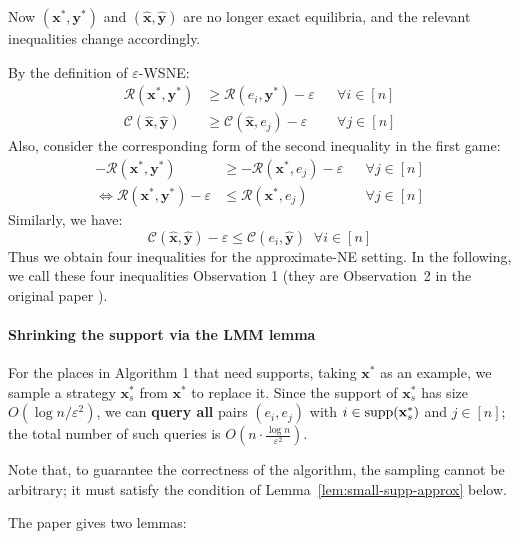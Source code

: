 Now \((\mathbf{x}^*, \mathbf{y}^*)\) and \((\hat{\mathbf{x}}, \hat{\mathbf{y}})\) are no longer exact equilibria, and the relevant inequalities change accordingly.

By the definition of \(\varepsilon\)-WSNE:
\begin{align*}
  \mathcal{R}(\mathbf{x}^*, \mathbf{y}^*)         & \ge \mathcal{R}(e_i, \mathbf{y}^*) - \varepsilon     &  & \forall i \in [n] \\
  \mathcal{C}(\hat{\mathbf{x}}, \hat{\mathbf{y}}) & \ge \mathcal{C}(\hat{\mathbf{x}}, e_j) - \varepsilon &  & \forall j \in [n]
\end{align*}
Also, consider the corresponding form of the second inequality in the first game:
\begin{align*}
  -\mathcal{R}(\mathbf{x}^*, \mathbf{y}^*)                   & \ge -\mathcal{R}(\mathbf{x}^*, e_j) - \varepsilon &  & \forall j \in [n] \\
  \iff \mathcal{R}(\mathbf{x}^*, \mathbf{y}^*) - \varepsilon & \le \mathcal{R}(\mathbf{x}^*, e_j)                &  & \forall j \in [n]
\end{align*}
Similarly, we have:
\[
  \mathcal{C}(\hat{\mathbf{x}}, \hat{\mathbf{y}}) - \varepsilon \le \mathcal{C}(e_i, \hat{\mathbf{y}}) \;\; \forall i \in [n]
\]
Thus we obtain four inequalities for the approximate-NE setting. In the following, we call these four inequalities Observation 1 (they are Observation~2 in the original paper \cite[Observation~2]{12WSNE}).

\paragraph{Shrinking the support via the LMM lemma}

For the places in Algorithm 1 that need supports, taking \(\mathbf{x}^*\) as an example, we sample a strategy \(\mathbf{x}_s^*\) from \(\mathbf{x}^*\) to replace it. Since the support of \(\mathbf{x}_s^*\) has size \(O(\log n / \varepsilon^2)\), we can \textbf{query all} pairs \((e_i, e_j)\) with \(i \in \operatorname{supp}(\mathbf{x}_s^*)\) and \(j \in [n]\); the total number of such queries is \(O(n \cdot \frac{\log n}{\varepsilon^2})\).

Note that, to guarantee the correctness of the algorithm, the sampling cannot be arbitrary; it must satisfy the condition of Lemma~\ref{lem:small-supp-approx} below.

The paper gives two lemmas:

